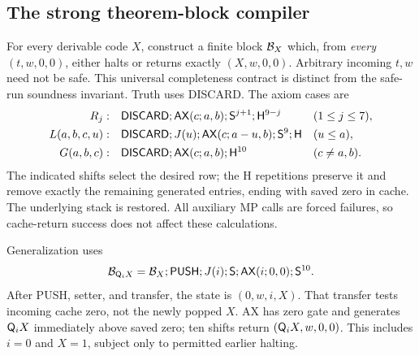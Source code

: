 \subsection{The strong theorem-block compiler}

For every derivable code $X$, construct a finite block $\mathcal B_X$
which, from \emph{every} $(t,w,0,0)$, either halts or returns exactly
$(X,w,0,0)$. Arbitrary incoming $t,w$ need not be safe. This universal
completeness contract is distinct from the safe-run soundness invariant.
Truth uses DISCARD. The axiom cases are
\begin{align*}
 R_j:\quad&\mathsf{DISCARD};\mathsf{AX}(c;a,b);\mathsf S^{j+1};\mathsf H^{9-j}
                    &&(1\leq j\leq7),\\
 L(a,b,c,u):\quad&\mathsf{DISCARD};J(u);\mathsf{AX}(c;a-u,b);\mathsf S^9;\mathsf H
                    &&(u\leq a),\\
 G(a,b,c):\quad&\mathsf{DISCARD};\mathsf{AX}(c;a,b);\mathsf H^{10}
                    &&(c\ne a,b).
\end{align*}
The indicated shifts select the desired row; the H repetitions preserve
it and remove exactly the remaining generated entries, ending with
saved zero in cache. The underlying stack is restored. All auxiliary
MP calls are forced failures, so cache-return success does not affect
these calculations.

Generalization uses
\[
 \mathcal B_{\mathsf Q_iX}=
 \mathcal B_X;\mathsf{PUSH};J(i);\mathsf S;\mathsf{AX}(i;0,0);\mathsf S^{10}.
\]
After PUSH, setter, and transfer, the state is $(0,w,i,X)$. That
transfer tests incoming cache zero, not the newly popped $X$. AX has
zero gate and generates $\mathsf Q_iX$ immediately above saved zero;
ten shifts return $(\mathsf Q_iX,w,0,0)$. This includes $i=0$ and
$X=1$, subject only to permitted earlier halting.

